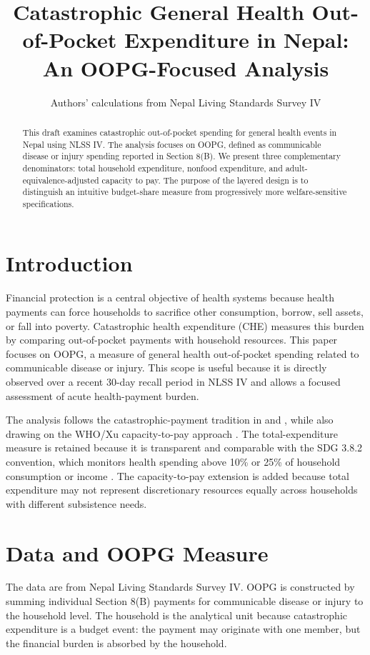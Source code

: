 \documentclass[11pt]{article}
\title{Catastrophic General Health Out-of-Pocket Expenditure in Nepal: An OOPG-Focused Analysis}
\author{Authors' calculations from Nepal Living Standards Survey IV}
\date{}
\begin{document}
\maketitle

\begin{abstract}
This draft examines catastrophic out-of-pocket spending for general health events in Nepal using NLSS IV. The analysis focuses on OOPG, defined as communicable disease or injury spending reported in Section 8(B). We present three complementary denominators: total household expenditure, nonfood expenditure, and adult-equivalence-adjusted capacity to pay. The purpose of the layered design is to distinguish an intuitive budget-share measure from progressively more welfare-sensitive specifications.
\end{abstract}

\section{Introduction}

Financial protection is a central objective of health systems because health payments can force households to sacrifice other consumption, borrow, sell assets, or fall into poverty. Catastrophic health expenditure (CHE) measures this burden by comparing out-of-pocket payments with household resources. This paper focuses on OOPG, a measure of general health out-of-pocket spending related to communicable disease or injury. This scope is useful because it is directly observed over a recent 30-day recall period in NLSS IV and allows a focused assessment of acute health-payment burden.

The analysis follows the catastrophic-payment tradition in \citet{odonnell2008} and \citet{wagstaff2003}, while also drawing on the WHO/Xu capacity-to-pay approach \citep{xu2003,xu2005}. The total-expenditure measure is retained because it is transparent and comparable with the SDG 3.8.2 convention, which monitors health spending above 10\% or 25\% of household consumption or income \citep{who2026sdg382}. The capacity-to-pay extension is added because total expenditure may not represent discretionary resources equally across households with different subsistence needs.

\section{Data and OOPG Measure}

The data are from Nepal Living Standards Survey IV. OOPG is constructed by summing individual Section 8(B) payments for communicable disease or injury to the household level. The household is the analytical unit because catastrophic expenditure is a budget event: the payment may originate with one member, but the financial burden is absorbed by the household.
\end{document}
